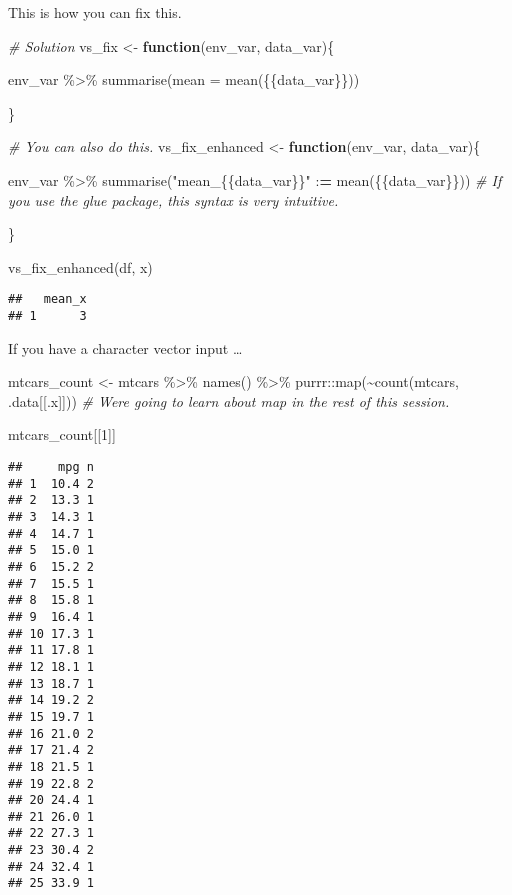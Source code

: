\documentclass[
]{book}
\newenvironment{Shaded}{\begin{snugshade}}{\end{snugshade}}
\newcommand{\AttributeTok}[1]{\textcolor[rgb]{0.77,0.63,0.00}{#1}}
\newcommand{\CommentTok}[1]{\textcolor[rgb]{0.56,0.35,0.01}{\textit{#1}}}
\newcommand{\ControlFlowTok}[1]{\textcolor[rgb]{0.13,0.29,0.53}{\textbf{#1}}}
\newcommand{\DecValTok}[1]{\textcolor[rgb]{0.00,0.00,0.81}{#1}}
\newcommand{\ErrorTok}[1]{\textcolor[rgb]{0.64,0.00,0.00}{\textbf{#1}}}
\newcommand{\FunctionTok}[1]{\textcolor[rgb]{0.00,0.00,0.00}{#1}}
\newcommand{\NormalTok}[1]{#1}
\newcommand{\OtherTok}[1]{\textcolor[rgb]{0.56,0.35,0.01}{#1}}
\newcommand{\SpecialCharTok}[1]{\textcolor[rgb]{0.00,0.00,0.00}{#1}}
\newcommand{\StringTok}[1]{\textcolor[rgb]{0.31,0.60,0.02}{#1}}
\begin{document}
This is how you can fix this.

\begin{Shaded}
\begin{Highlighting}[]
\CommentTok{\# Solution}
\NormalTok{vs\_fix }\OtherTok{\textless{}{-}} \ControlFlowTok{function}\NormalTok{(env\_var, data\_var)\{}
 
\NormalTok{   env\_var }\SpecialCharTok{\%\textgreater{}\%}
    \FunctionTok{summarise}\NormalTok{(}\AttributeTok{mean =} \FunctionTok{mean}\NormalTok{(\{\{data\_var\}\}))}

\NormalTok{\}}

\CommentTok{\# You can also do this. }
\NormalTok{vs\_fix\_enhanced }\OtherTok{\textless{}{-}} \ControlFlowTok{function}\NormalTok{(env\_var, data\_var)\{}
 
\NormalTok{   env\_var }\SpecialCharTok{\%\textgreater{}\%}
    \FunctionTok{summarise}\NormalTok{(}\StringTok{"mean\_\{\{data\_var\}\}"} \SpecialCharTok{:}\ErrorTok{=} \FunctionTok{mean}\NormalTok{(\{\{data\_var\}\})) }\CommentTok{\# If you use the glue package, this syntax is very intuitive.}

\NormalTok{\}}

\FunctionTok{vs\_fix\_enhanced}\NormalTok{(df, x)}
\end{Highlighting}
\end{Shaded}

\begin{verbatim}
##   mean_x
## 1      3
\end{verbatim}

If you have a character vector input \ldots{}

\begin{Shaded}
\begin{Highlighting}[]
\NormalTok{mtcars\_count }\OtherTok{\textless{}{-}}\NormalTok{ mtcars }\SpecialCharTok{\%\textgreater{}\%}
  \FunctionTok{names}\NormalTok{() }\SpecialCharTok{\%\textgreater{}\%}
\NormalTok{  purrr}\SpecialCharTok{::}\FunctionTok{map}\NormalTok{(}\SpecialCharTok{\textasciitilde{}}\FunctionTok{count}\NormalTok{(mtcars, .data[[.x]])) }\CommentTok{\# We\textquotesingle{}re going to learn about map in the rest of this session.}

\NormalTok{mtcars\_count[[}\DecValTok{1}\NormalTok{]]}
\end{Highlighting}
\end{Shaded}

\begin{verbatim}
##     mpg n
## 1  10.4 2
## 2  13.3 1
## 3  14.3 1
## 4  14.7 1
## 5  15.0 1
## 6  15.2 2
## 7  15.5 1
## 8  15.8 1
## 9  16.4 1
## 10 17.3 1
## 11 17.8 1
## 12 18.1 1
## 13 18.7 1
## 14 19.2 2
## 15 19.7 1
## 16 21.0 2
## 17 21.4 2
## 18 21.5 1
## 19 22.8 2
## 20 24.4 1
## 21 26.0 1
## 22 27.3 1
## 23 30.4 2
## 24 32.4 1
## 25 33.9 1
\end{verbatim}
\end{document}
